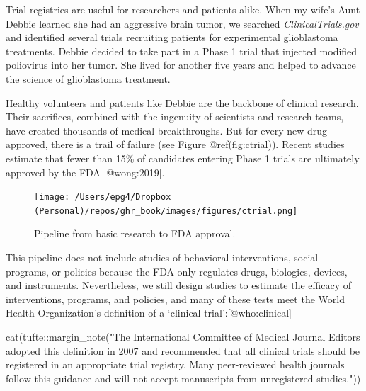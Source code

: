 \documentclass[
  letterpaper,
  DIV=11,
  numbers=noendperiod,
  oneside]{scrartcl}
\newenvironment{Shaded}{\begin{snugshade}}{\end{snugshade}}
\newcommand{\FunctionTok}[1]{\textcolor[rgb]{0.28,0.35,0.67}{#1}}
\newcommand{\NormalTok}[1]{\textcolor[rgb]{0.00,0.23,0.31}{#1}}
\newcommand{\SpecialCharTok}[1]{\textcolor[rgb]{0.37,0.37,0.37}{#1}}
\newcommand{\StringTok}[1]{\textcolor[rgb]{0.13,0.47,0.30}{#1}}
\begin{document}
Trial registries are useful for researchers and patients alike. When my
wife's Aunt Debbie learned she had an aggressive brain tumor, we
searched \emph{ClinicalTrials.gov} and identified several trials
recruiting patients for experimental glioblastoma treatments. Debbie
decided to take part in a Phase 1 trial that injected modified
poliovirus into her tumor. She lived for another five years and helped
to advance the science of glioblastoma treatment.

Healthy volunteers and patients like Debbie are the backbone of clinical
research. Their sacrifices, combined with the ingenuity of scientists
and research teams, have created thousands of medical breakthroughs. But
for every new drug approved, there is a trail of failure (see Figure
@ref(fig:ctrial)). Recent studies estimate that fewer than 15\% of
candidates entering Phase 1 trials are ultimately approved by the FDA
{[}@wong:2019{]}.

\begin{Shaded}
\end{Shaded}

\begin{figure}[H]

{\centering \texttt{[image: /Users/epg4/Dropbox (Personal)/repos/ghr\_book/images/figures/ctrial.png]}

}

\caption{Pipeline from basic research to FDA approval.}

\end{figure}

This pipeline does not include studies of behavioral interventions,
social programs, or policies because the FDA only regulates drugs,
biologics, devices, and instruments. Nevertheless, we still design
studies to estimate the efficacy of interventions, programs, and
policies, and many of these tests meet the World Health Organization's
definition of a `clinical trial':{[}@who:clinical{]}

\begin{Shaded}
\begin{Highlighting}[]
\FunctionTok{cat}\NormalTok{(tufte}\SpecialCharTok{::}\FunctionTok{margin\_note}\NormalTok{(}\StringTok{"The International Committee of Medical Journal Editors adopted this definition in 2007 and recommended that all clinical trials should be registered in an appropriate trial registry. Many peer{-}reviewed health journals follow this guidance and will not accept manuscripts from unregistered studies."}\NormalTok{))}
\end{Highlighting}
\end{Shaded}
\end{document}
